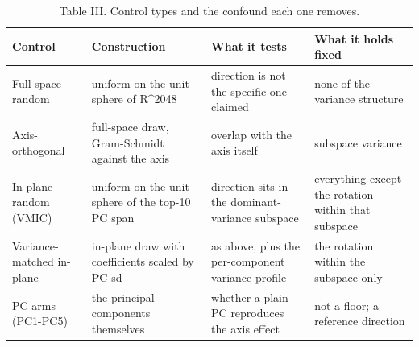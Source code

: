 \begin{table}[t]
\centering
\caption{Table III. Control types and the confound each one removes.}
\label{tab:iii}
\begin{tabular}{llll}
\toprule
Control & Construction & What it tests & What it holds fixed \\
\midrule
Full-space random & uniform on the unit sphere of R^2048 & direction is not the specific one claimed & none of the variance structure \\
Axis-orthogonal & full-space draw, Gram-Schmidt against the axis & overlap with the axis itself & subspace variance \\
In-plane random (VMIC) & uniform on the unit sphere of the top-10 PC span & direction sits in the dominant-variance subspace & everything except the rotation within that subspace \\
Variance-matched in-plane & in-plane draw with coefficients scaled by PC sd & as above, plus the per-component variance profile & the rotation within the subspace only \\
PC arms (PC1-PC5) & the principal components themselves & whether a plain PC reproduces the axis effect & not a floor; a reference direction \\
\bottomrule
\end{tabular}
\end{table}